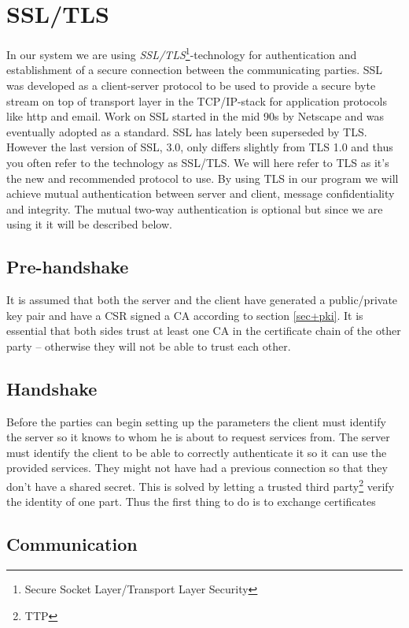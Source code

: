 \documentclass[10pt, a4paper]{article}
\begin{document}
\section{SSL/TLS}
\label{sec+tls}
In our system we are using \emph{SSL/TLS}\footnote{Secure Socket Layer/Transport Layer Security}-technology for authentication and establishment of a secure connection between the communicating parties. SSL was developed as a client-server protocol to be used to provide a secure byte stream on top of transport layer in the TCP/IP-stack for application protocols like http and email. Work on SSL started in the mid 90s by Netscape and was eventually adopted as a standard. SSL has lately been superseded by TLS. However the last version of SSL, 3.0, only differs slightly from TLS 1.0 and thus you often refer to the technology as SSL/TLS. We will here refer to TLS as it's the new  and recommended protocol to use. By using TLS in our program we will achieve mutual authentication between server and client, message confidentiality and integrity. The mutual two-way authentication is optional but since we are using it it will be described below.


\subsection{Pre-handshake}
It is assumed that both the server and the client have generated a public/private key pair and have a CSR signed a CA according to section \ref{sec+pki}. It is essential that both sides trust at least one CA in the certificate chain of the other party -- otherwise they will not be able to trust each other.

\subsection{Handshake}
Before the parties can begin setting up the parameters the client must identify the server so it knows to whom he is about to request services from. The server must identify the client to be able to correctly authenticate it so it can use the provided services. They might not have had a previous connection so that they don't have a shared secret. This is solved by letting a trusted third party\footnote{TTP} verify the identity of one part. Thus the first thing to do is to exchange certificates 

\subsection{Communication}
\end{document}
